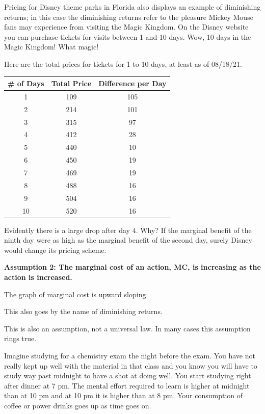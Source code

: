 \documentclass[
]{book}
\begin{document}
Pricing for Disney theme parks in Florida also displays an example of diminishing returns; in this case the diminishing returns refer to the pleasure Mickey Mouse fans may experience from visiting the Magic Kingdom. On the Disney website you can purchase tickets for visits between 1 and 10 days. Wow, 10 days in the Magic Kingdom! What magic!

Here are the total prices for tickets for 1 to 10 days, at least as of 08/18/21.

\begin{longtable}[]{@{}ccc@{}}
\toprule
\# of Days & Total Price & Difference per Day \\
\midrule
\endhead
1 & 109 & 105 \\
2 & 214 & 101 \\
3 & 315 & 97 \\
4 & 412 & 28 \\
5 & 440 & 10 \\
6 & 450 & 19 \\
7 & 469 & 19 \\
8 & 488 & 16 \\
9 & 504 & 16 \\
10 & 520 & 16 \\
\bottomrule
\end{longtable}

Evidently there is a large drop after day 4. Why? If the marginal benefit of the ninth day were as high as the marginal benefit of the second day, surely Disney would change its pricing scheme.

\begin{center}
\textbf{Assumption 2: The marginal cost of an action, MC, is increasing as the action is increased.}

\end{center}

The graph of marginal cost is upward sloping.

This also goes by the name of diminishing returns.

This is also an assumption, not a universal law. In many cases this assumption rings true.

Imagine studying for a chemistry exam the night before the exam. You have not really kept up well with the material in that class and you know you will have to study way past midnight to have a shot at doing well. You start studying right after dinner at 7 pm. The mental effort required to learn is higher at midnight than at 10 pm and at 10 pm it is higher than at 8 pm. Your consumption of coffee or power drinks goes up as time goes on.
\end{document}
